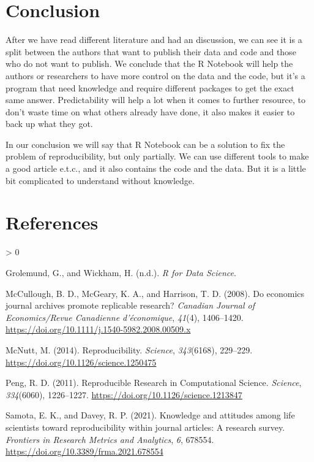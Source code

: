 \documentclass[
  12pt,
]{article}
\newlength{\cslhangindent}
\newenvironment{CSLReferences}[2] %
 {%
  \setlength{\parindent}{0pt}
  \ifodd #1 \everypar{\setlength{\hangindent}{\cslhangindent}}\ignorespaces\fi
  \ifnum #2 > 0
  \setlength{\parskip}{#2\baselineskip}
  \fi
 }%
 {}
\begin{document}
\hypertarget{conclusion}{%
\section{Conclusion}\label{conclusion}}

After we have read different literature and had an discussion, we can
see it is a split between the authors that want to publish their data
and code and those who do not want to publish. We conclude that the R
Notebook will help the authors or researchers to have more control on
the data and the code, but it's a program that need knowledge and
require different packages to get the exact same answer. Predictability
will help a lot when it comes to further resource, to don't waste time
on what others already have done, it also makes it easier to back up
what they got.

In our conclusion we will say that R Notebook can be a solution to fix
the problem of reproducibility, but only partially. We can use different
tools to make a good article e.t.c., and it also contains the code and
the data. But it is a little bit complicated to understand without
knowledge.

\hypertarget{references}{%
\section{References}\label{references}}

\hypertarget{refs}{}
\begin{CSLReferences}{1}{0}
\leavevmode\hypertarget{ref-grolemund}{}%
Grolemund, G., and Wickham, H. (n.d.). \emph{R for {Data Science}}.

\leavevmode\hypertarget{ref-mccullough2008}{}%
McCullough, B. D., McGeary, K. A., and Harrison, T. D. (2008). Do
economics journal archives promote replicable research? \emph{Canadian
Journal of Economics/Revue Canadienne d'économique}, \emph{41}(4),
1406--1420. \url{https://doi.org/10.1111/j.1540-5982.2008.00509.x}

\leavevmode\hypertarget{ref-mcnutt2014}{}%
McNutt, M. (2014). Reproducibility. \emph{Science}, \emph{343}(6168),
229--229. \url{https://doi.org/10.1126/science.1250475}

\leavevmode\hypertarget{ref-peng2011}{}%
Peng, R. D. (2011). Reproducible {Research} in {Computational Science}.
\emph{Science}, \emph{334}(6060), 1226--1227.
\url{https://doi.org/10.1126/science.1213847}

\leavevmode\hypertarget{ref-samota2021}{}%
Samota, E. K., and Davey, R. P. (2021). Knowledge and attitudes among
life scientists toward reproducibility within journal articles: A
research survey. \emph{Frontiers in Research Metrics and Analytics},
\emph{6}, 678554. \url{https://doi.org/10.3389/frma.2021.678554}

\end{CSLReferences}
\end{document}
